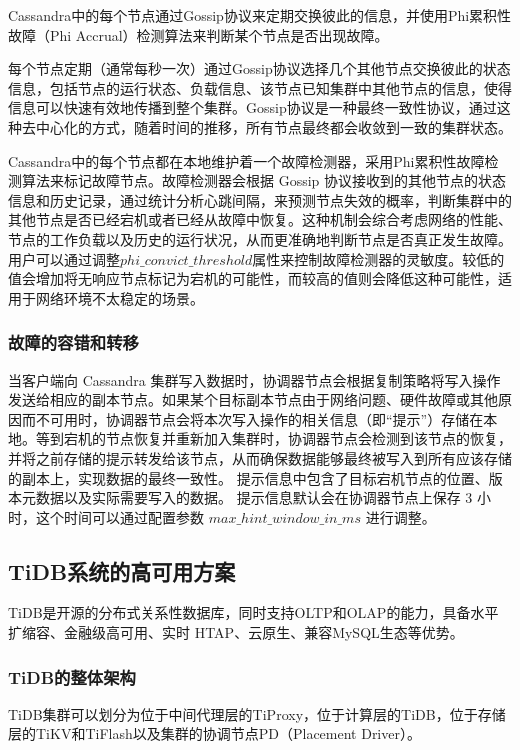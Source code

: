 Cassandra中的每个节点通过Gossip协议来定期交换彼此的信息，并使用Phi累积性故障（Phi Accrual）检测算法\cite{hayashibara2004spl}来判断某个节点是否出现故障。

每个节点定期（通常每秒一次）通过Gossip协议选择几个其他节点交换彼此的状态信息，包括节点的运行状态、负载信息、该节点已知集群中其他节点的信息，使得信息可以快速有效地传播到整个集群。Gossip协议是一种最终一致性协议，通过这种去中心化的方式，随着时间的推移，所有节点最终都会收敛到一致的集群状态。

Cassandra中的每个节点都在本地维护着一个故障检测器，采用Phi累积性故障检测算法来标记故障节点。故障检测器会根据 Gossip 协议接收到的其他节点的状态信息和历史记录，通过统计分析心跳间隔，来预测节点失效的概率，判断集群中的其他节点是否已经宕机或者已经从故障中恢复。这种机制会综合考虑网络的性能、节点的工作负载以及历史的运行状况，从而更准确地判断节点是否真正发生故障。用户可以通过调整$phi\_convict\_threshold$属性来控制故障检测器的灵敏度。较低的值会增加将无响应节点标记为宕机的可能性，而较高的值则会降低这种可能性，适用于网络环境不太稳定的场景。


\subsubsection{故障的容错和转移}

当客户端向 Cassandra 集群写入数据时，协调器节点会根据复制策略将写入操作发送给相应的副本节点。如果某个目标副本节点由于网络问题、硬件故障或其他原因而不可用时，协调器节点会将本次写入操作的相关信息（即“提示”）存储在本地。等到宕机的节点恢复并重新加入集群时，协调器节点会检测到该节点的恢复，并将之前存储的提示转发给该节点，从而确保数据能够最终被写入到所有应该存储的副本上，实现数据的最终一致性。
提示信息中包含了目标宕机节点的位置、版本元数据以及实际需要写入的数据。
提示信息默认会在协调器节点上保存 3 小时，这个时间可以通过配置参数 $max\_hint\_window\_in\_ms$ 进行调整。


\subsection{TiDB系统的高可用方案}
TiDB\cite{huang2020tidb}是开源的分布式关系性数据库，同时支持OLTP和OLAP的能力，具备水平扩缩容、金融级高可用、实时 HTAP、云原生、兼容MySQL生态等优势。

\subsubsection{TiDB的整体架构}

TiDB集群可以划分为位于中间代理层的TiProxy，位于计算层的TiDB，位于存储层的TiKV和TiFlash以及集群的协调节点PD（Placement Driver）。

